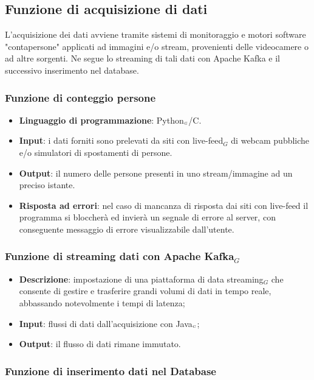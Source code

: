 \subsection{Funzione di acquisizione di dati}\label{}
L'acquisizione dei dati avviene tramite sistemi di monitoraggio e motori software "contapersone" applicati ad immagini e/o stream, provenienti delle videocamere o ad altre sorgenti. Ne segue lo streaming di tali dati con Apache Kafka e il successivo inserimento nel database.

\subsubsection{Funzione di conteggio persone}\label{}
\begin{itemize}
\item \textbf{Linguaggio di programmazione}: Python$_{\scaleto{G}{3pt}}$/C.
\item \textbf{Input}: i dati forniti sono prelevati da siti con live-feed$_G$ di webcam pubbliche e/o simulatori di spostamenti di persone.
\item \textbf{Output}: il numero delle persone presenti in uno stream/immagine ad un preciso istante.
\item \textbf{Risposta ad errori}: nel caso di mancanza di risposta dai siti con live-feed il programma si bloccherà ed invierà un segnale di errore al server, con conseguente messaggio di errore visualizzabile dall'utente.
\end{itemize}

\subsubsection{Funzione di streaming dati con Apache Kafka$_G$}\label{}

\begin{itemize}
	\item \textbf{Descrizione}: impostazione di una piattaforma di data streaming$_G$ che consente di gestire e trasferire grandi volumi di dati in tempo reale, abbassando notevolmente i tempi di latenza;
	\item \textbf{Input}: flussi di dati dall'acquisizione con Java$_{\scaleto{G}{3pt}}$;
		\item \textbf{Output}: il flusso di dati rimane immutato.
\end{itemize}

\subsubsection{Funzione di inserimento dati nel Database}\label{}

